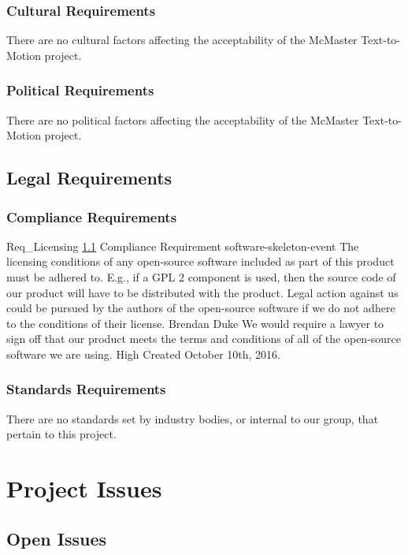 \documentclass{scrreprt}
\begin{document}
\subsection{Cultural Requirements}

There are no cultural factors affecting the acceptability of the McMaster
Text-to-Motion project.

\subsection{Political Requirements}

There are no political factors affecting the acceptability of the McMaster
Text-to-Motion project.

\section{Legal Requirements}

\subsection{Compliance Requirements}
\label{req-compliance}

\requirement
{Req_Licensing}
{\ref{req-compliance} Compliance Requirement}
{software-skeleton-event}
{The licensing conditions of any open-source software included as part of this
product must be adhered to. E.g., if a GPL 2 component is used, then the source
code of our product will have to be distributed with the product.}
{Legal action against us could be pursued by the authors of the open-source
software if we do not adhere to the conditions of their license.}
{Brendan Duke}
{We would require a lawyer to sign off that our product meets the terms and
conditions of all of the open-source software we are using.}
{High}
{Created October 10th, 2016.}

\subsection{Standards Requirements}

There are no standards set by industry bodies, or internal to our group, that
pertain to this project.

\chapter{Project Issues}

\section{Open Issues}
\end{document}

